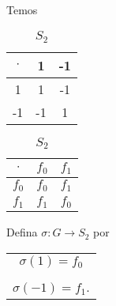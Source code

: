 \documentclass{beamer}
\begin{document}
    \begin{frame}
        Temos \pause
        \begin{table}
            \begin{minipage}{.5\linewidth}
                \caption*{$G$}
                \centering
                \begin{tabular}{|c|c|c|}
                    \hline
                    $\cdot$ & 1 & -1\\
                    \hline
                    1 & 1 & -1\\
                    \hline
                    -1 & -1 & 1\\
                    \hline
                \end{tabular}
            \end{minipage}%
            \pause
            \begin{minipage}{.5\linewidth}
                \caption*{$S_2$}
                \centering
                \begin{tabular}{|c|c|c|}
                    \hline
                    $\cdot$ & $f_0$ & $f_1$\\
                    \hline
                    $f_0$ & $f_0$ & $f_1$\\
                    \hline
                    $f_1$ & $f_1$ & $f_0$\\
                    \hline
                \end{tabular}
            \end{minipage}\pause
        \end{table}

        \vspace{.4cm}

        Defina $\sigma : G \to S_2$ por \pause
        \begin{center}
            \begin{tabular}{c}
                $\sigma(1) = f_0$ \pause\\
                \vspace{.3cm}\\
                $\sigma(-1) = f_1$.
            \end{tabular}
        \end{center}
    \end{frame}
\end{document}
